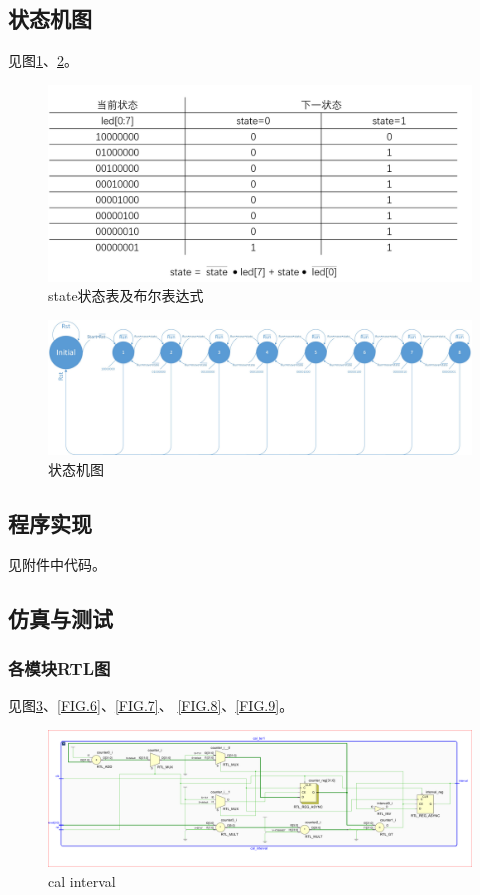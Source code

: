 \documentclass[UTF8]{article}
\begin{document}
\subsection{状态机图}
见图\ref{FIG.3}、\ref{FIG.4}。

\begin{figure}[H]
    \centering
    \includegraphics[scale=0.5]{state状态表及布尔表达式.PNG}
    \caption{state状态表及布尔表达式}
    \label{FIG.3}
\end{figure}

\begin{figure}[H]
    \centering
    \includegraphics[scale=0.2]{状态机图.jpg}
    \caption{状态机图}
    \label{FIG.4}
\end{figure}
\subsection{程序实现}

见附件中代码。

\subsection{仿真与测试}
\subsubsection{各模块RTL图}

见图\ref{FIG.5}、\ref{FIG.6}、\ref{FIG.7}、
\ref{FIG.8}、\ref{FIG.9}。
\begin{figure}[H]

    \centering
    \includegraphics[scale=0.4]{cal_interval.PNG}
    \caption{cal interval}
    \label{FIG.5}
\end{figure}
\end{document}
